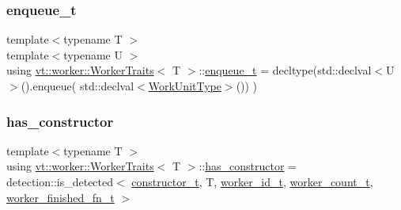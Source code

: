 \subsubsection{\texorpdfstring{enqueue\+\_\+t}{enqueue\_t}}
{\footnotesize\ttfamily template$<$typename T $>$ \\
template$<$typename U $>$ \\
using \hyperlink{structvt_1_1worker_1_1_worker_traits}{vt\+::worker\+::\+Worker\+Traits}$<$ T $>$\+::\hyperlink{structvt_1_1worker_1_1_worker_traits_a017de8e435dfce71e241f5288e199454}{enqueue\+\_\+t} =  decltype(std\+::declval$<$U$>$().enqueue( std\+::declval$<$\hyperlink{namespacevt_1_1worker_a59d2fcdafa81fc0af7f921a258e42202}{Work\+Unit\+Type}$>$()) )}

\mbox{\label{structvt_1_1worker_1_1_worker_traits_ac7982bde8aa7e29a3da7cd87d5db2048}} 
\subsubsection{\texorpdfstring{has\+\_\+constructor}{has\_constructor}}
{\footnotesize\ttfamily template$<$typename T $>$ \\
using \hyperlink{structvt_1_1worker_1_1_worker_traits}{vt\+::worker\+::\+Worker\+Traits}$<$ T $>$\+::\hyperlink{structvt_1_1worker_1_1_worker_traits_ac7982bde8aa7e29a3da7cd87d5db2048}{has\+\_\+constructor} =  detection\+::is\+\_\+detected$<$ \hyperlink{structvt_1_1worker_1_1_worker_traits_a37e115e6de3c0dce681e017d2bd0baab}{constructor\+\_\+t}, T, \hyperlink{structvt_1_1worker_1_1_worker_traits_a001b1872338e22e51f91bde53cf2cb0a}{worker\+\_\+id\+\_\+t}, \hyperlink{structvt_1_1worker_1_1_worker_traits_af8f4b5fb160922a2d259889c19ef9ad5}{worker\+\_\+count\+\_\+t}, \hyperlink{structvt_1_1worker_1_1_worker_traits_a56b88053f1de41d391048fb82ab513f0}{worker\+\_\+finished\+\_\+fn\+\_\+t} $>$}

\mbox{\label{structvt_1_1worker_1_1_worker_traits_a426f21bc7d1913681a26c10b58ee5d0b}} 
